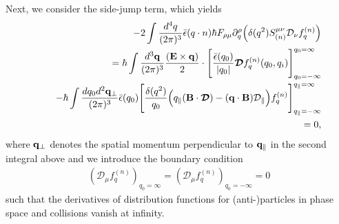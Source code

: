 \documentclass[aps,prd,showkeys,preprint,amsmath,amssymb,nofootinbib]{revtex4-1}
\begin{document}
Next, we consider the side-jump term, which yields 
\begin{eqnarray}\nonumber
&&-2\int\frac{d^4q}{(2\pi)^3}\bar{\epsilon}(q\cdot n)\hbar F_{\rho\mu}\partial^{\rho}_{q}\Big(\delta(q^2)S^{\mu\nu}_{(n)}\mathcal{D}_{\nu}f^{(n)}_q\Big)
\\\nonumber
&&=\hbar\int\frac{d^3{\bf q}}{(2\pi)^3} \frac{({\bf E\times q})}{2}\cdot\Bigg[\frac{\bar{\epsilon}(q_0)}{|q_0|}\bm{\mathcal{D}}f^{(n)}_q(q_0,q_i)\Bigg]^{q_0=\infty}_{q_0=-\infty}
\\\nonumber
&&\quad
-\hbar\int\frac{dq_0d^2{\bf q}_{\perp}}{(2\pi)^3}\bar{\epsilon}(q_0)
\Bigg[\frac{\delta(q^2)}{q_0}\Big(q_{\parallel}({\bf B}\cdot\bm{\mathcal{D}})-({\bf q\cdot B})\mathcal{D}_{\parallel}\Big)f^{(n)}_q\Bigg]^{q_{\parallel}=\infty}_{q_{\parallel}=-\infty} 
\\
&&=0,
\end{eqnarray}
where ${\bf q}_{\perp}$ denotes the spatial momentum perpendicular to ${\bf q}_{\parallel}$ in the second integral above and we introduce the boundary condition
\begin{eqnarray}
(\mathcal{D}_{\mu}f^{(n)}_q)_{q_0=\infty}=(\mathcal{D}_{\mu}f^{(n)}_q)_{q_0=-\infty}=0
\end{eqnarray}
such that the derivatives of distribution functions for (anti-)particles in phase space and collisions vanish at infinity. 
\end{document}
